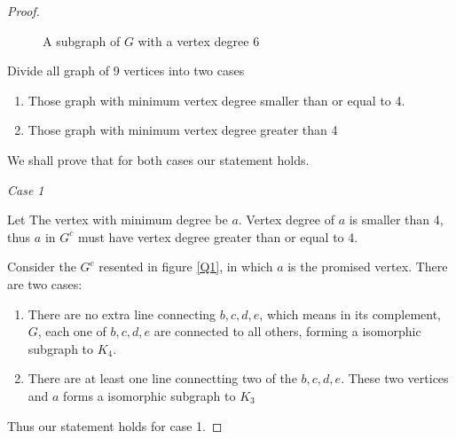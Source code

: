 \documentclass[12pt]{article}
\begin{document}
\begin{proof}
\begin{figure}
  \caption{A subgraph of $G$ with a vertex degree 6}
  \label{Q1:Vertex6}
\end{figure}

Divide all graph of 9 vertices into two cases

\begin{enumerate}
\item Those graph with minimum vertex degree smaller than or equal to 4.
\item Those graph with minimum vertex degree greater than 4
\end{enumerate}

We shall prove that for both cases our statement holds.

\emph{Case 1}

Let The vertex with minimum degree be $a$. Vertex degree of $a$ is smaller than 4, thus $a$ in $G^c$ must have vertex degree greater than or equal to 4. 

Consider the $G^c$ resented in figure \ref{Q1}, in which $a$ is the promised vertex. There are two cases:

\begin{enumerate}[label=\alph*)]
  \item There are no extra  line connecting $b,c,d,e$, which means in its complement, $G$, each one of $b,c,d,e$ are connected to all others, forming a isomorphic subgraph to $K_4$.
  \item There are at least one  line connectting two of the $b,c,d,e$. These two vertices and $a$ forms a isomorphic subgraph to $K_3$
\end{enumerate}

Thus our statement holds for case 1.


\end{proof}
\end{document}

